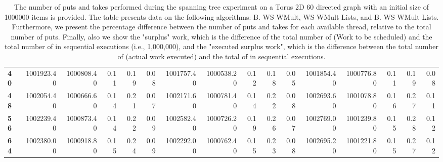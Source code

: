 \begin{table}[!ht]
{\begin{tabular}{lrrrrrrrrrrrrrrr}
\textbf{40} &  1001923.40 & 1000808.40 &           0.11 &        0.19 &                 0.08 &     1001757.40 & 1000538.20 &           0.12 &        0.18 &                 0.05 &        1001854.40 & 1000776.80 &           0.11 &        0.19 &                 0.08 \\
\textbf{48} &  1002054.40 & 1000666.60 &           0.14 &        0.21 &                 0.07 &     1002171.60 & 1000781.40 &           0.14 &        0.22 &                 0.08 &        1002693.60 & 1001078.80 &           0.16 &        0.27 &                 0.11 \\
\textbf{56} &  1002239.40 & 1000873.40 &           0.14 &        0.22 &                 0.09 &     1002582.40 & 1000726.20 &           0.19 &        0.26 &                 0.07 &        1002769.00 & 1001239.80 &           0.15 &        0.28 &                 0.12 \\
\textbf{64} &  1002380.00 & 1000918.80 &           0.15 &        0.24 &                 0.09 &     1002292.00 & 1000762.40 &           0.15 &        0.23 &                 0.08 &        1002695.20 & 1001221.80 &           0.15 &        0.27 &                 0.12 \\
\bottomrule
\end{tabular}}
\label{difference-Torus_2D_60_directed-1000000-B_WS_NC_MULT_OPT-WS_NC_MULT_LA_OPT-B_WS_NC_MULT_LA_OPT}
\caption{The number of puts and takes performed during the
    spanning tree experiment on a Torus 2D 60 directed graph with an initial size
    of 1000000 items is provided. The table presents data on the
    following algorithms: B. WS WMult, WS WMult Lists, and
    B. WS WMult Lists. Furthermore, we present the percentage difference
    between the number of puts and takes for each available thread,
    relative to the total number of puts. Finally, also we show the
    "surplus" work, which is the difference of the total number of
    \Puts (Work to be scheduled) and the total number of \Puts in
    sequential executions (i.e., 1,000,000), and the "executed surplus
    work", which is the difference between the total number of \Takes
    (actual work executed) and the total of \Takes in sequential
    executions.}
\end{table}
